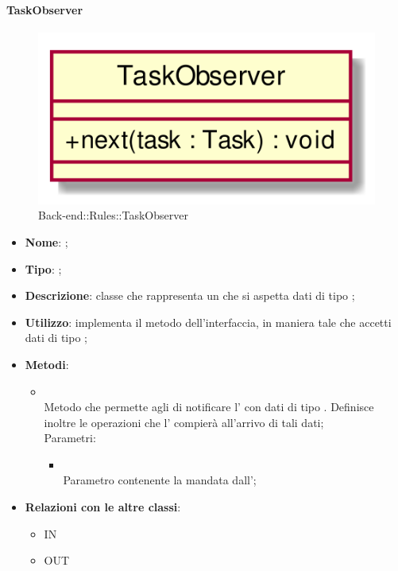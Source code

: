 \hypertarget{TaskObserver_label}{\paragraph{TaskObserver}}
\begin{figure}[h]
	\centering
	\includegraphics[width=\textwidth,height=\textheight,keepaspectratio]{images/ClassTaskObserver.png}
	\caption{Back-end::Rules::TaskObserver}
\end{figure}
\begin{itemize}
	\item \textbf{Nome}: ;
	\item \textbf{Tipo}: ;
	\item \textbf{Descrizione}: classe che rappresenta un  che si aspetta dati di tipo ;
	\item \textbf{Utilizzo}: implementa il metodo  dell'interfaccia, in maniera tale che accetti dati di tipo ;
	\item \textbf{Metodi}:
	\begin{itemize}
		\item[]  \\
		Metodo che permette agli  di notificare l' con dati di tipo . Definisce inoltre le operazioni che l' compierà all'arrivo di tali dati;\\
		Parametri:
		\begin{itemize}
			\item {} \\
			Parametro contenente la  mandata dall';
		\end{itemize}
	\end{itemize}
	\item \textbf{Relazioni con le altre classi}:
	\begin{itemize}
		\item IN \hyperlink{TaskObservable_label}{}
		\item OUT \hyperlink{Task_label}{}
	\end{itemize}
\end{itemize}
\FloatBarrier

